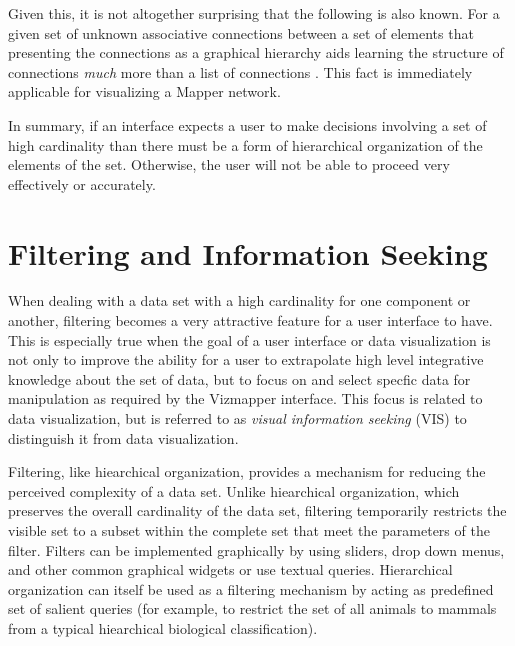 Given this, it is not altogether surprising that the following is also known. For a given set of unknown associative connections between a set of elements that presenting the connections as a graphical hierarchy aids learning the structure of connections \emph{much} more than a list of connections \cite{graphicalhierarchy1972}. This fact is immediately applicable for visualizing a Mapper network.

In summary, if an interface expects a user to make decisions involving a set of high cardinality than there must be a form of hierarchical organization of the elements of the set. Otherwise, the user will not be able to proceed very effectively or accurately.

\section{Filtering and Information Seeking}

\begin{comment}
The Structure of the Information Visualization Design Space, Section 5
dynamic queries technique 

Visual Information Seeking: Tight Coupling of Dynamic Query Filters with Starfield Displays
\end{comment}

When dealing with a data set with a high cardinality for one component or another, filtering becomes a very attractive feature for a user interface to have. This is especially true when the goal of a user interface or data visualization is not only to improve the ability for a user to extrapolate high level integrative knowledge about the set of data, but to focus on and select specfic data for manipulation as required by the Vizmapper interface. This focus is related to data visualization, but is referred to as \emph{visual information seeking} (VIS) to distinguish it from data visualization. 

Filtering, like hiearchical organization, provides a mechanism for reducing the perceived complexity of a data set. Unlike hiearchical organization, which preserves the overall cardinality of the data set, filtering temporarily restricts the visible set to a subset within the complete set that meet the parameters of the filter. Filters can be implemented graphically by using sliders, drop down menus, and other common graphical widgets or use textual queries. Hierarchical organization can itself be used as a filtering mechanism by acting as predefined set of salient queries (for example, to restrict the set of all animals to mammals from a typical hiearchical biological classification).

